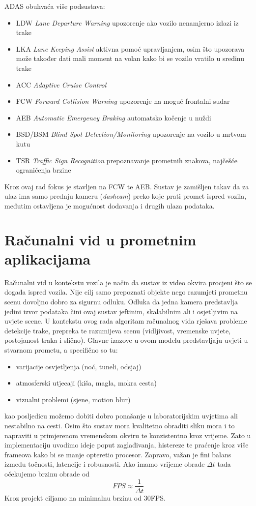 ADAS obuhvaća više podsustava:
\begin{itemize}
    \item LDW \textit{Lane Departure Warning} upozorenje ako vozilo nenamjerno izlazi iz trake
    \item LKA \textit{Lane Keeping Assist} aktivna pomoć upravljanjem, osim što upozorava može također dati mali moment na volan kako bi se vozilo vratilo u sredinu trake
    \item ACC \textit{Adaptive Cruise Control}
    \item FCW \textit{Forward Collision Warning} upozorenje na moguć frontalni sudar
    \item AEB \textit{Automatic Emergency Braking} automatsko kočenje u nuždi
    \item BSD/BSM \textit{Blind Spot Detection/Monitoring} upozorenje na vozilo u mrtvom kutu
    \item TSR \textit{Traffic Sign Recognition} prepoznavanje prometnih znakova, najčešće ograničenja brzine
\end{itemize}
Kroz ovaj rad fokus je stavljen na FCW te AEB. Sustav je zamišljen takav da za ulaz ima samo prednju kameru (\textit{dashcam}) preko koje prati promet ispred vozila, međutim ostavljena je mogućnost dodavanja i drugih ulaza podataka.

\section{Računalni vid u prometnim aplikacijama}
Računalni vid u kontekstu vozila je način da sustav iz video okvira procjeni što se događa ispred vozila. Nije cilj samo prepoznati objekte nego razumjeti prometnu scenu dovoljno dobro za sigurnu odluku.
Odluka da jedna kamera predstavlja jedini izvor podataka čini ovaj sustav jeftinim, skalabilnim ali i osjetljivim na uvjete scene.
U kontekstu ovog rada algoritam računalnog vida rješava probleme detekcije trake, prepreka te razumijeva scenu (vidljivost, vremenske uvjete, postojanost traka i slično).
Glavne izazove u ovom modelu predstavljaju uvjeti u stvarnom prometu, a specifično so tu:
\begin{itemize}
    \item varijacije osvjetljenja (noć, tuneli, odsjaj)
    \item atmosferski utjecaji (kiša, magla, mokra cesta)
    \item vizualni problemi (sjene, motion blur)
\end{itemize}
kao posljedicu možemo dobiti dobro ponašanje u laboratorijskim uvjetima ali nestabilno na cesti.
Osim što sustav mora kvalitetno obraditi sliku mora i to napraviti u primjerenom vremenskom okviru te konzistentno kroz vrijeme. Zato u implementaciju uvodimo ideje poput zaglađivanja, histereze te praćenje kroz više frameova kako bi se manje opteretio procesor.
Zapravo, važan je fini balans između točnosti, latencije i robusnosti. Ako imamo vrijeme obrade $\Delta t$ tada očekujemo brzinu obrade od $$FPS \approx \frac{1}{\Delta t}$$
Kroz projekt ciljamo na minimalnu brzinu od 30FPS.

